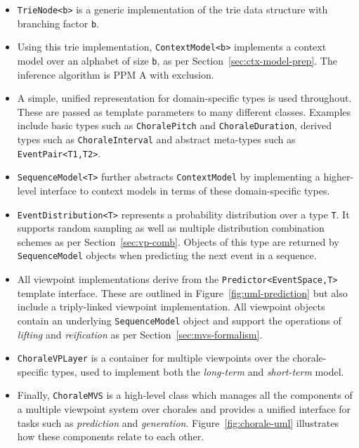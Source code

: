 \documentclass[12pt,a4paper,twoside,openright]{report}
\begin{document}
\begin{itemize}
  \item \texttt{TrieNode<b>} is a generic implementation of the trie data
    structure with branching factor \texttt{b}.
  \item Using this trie implementation, \texttt{ContextModel<b>} implements a
    context model over an alphabet of size \texttt{b}, as per
    Section~\ref{sec:ctx-model-prep}. The inference algorithm is PPM A with
    exclusion.
  \item A simple, unified representation for domain-specific types is used
    throughout.  These are passed as template parameters to many different
    classes. Examples include basic types such as \texttt{ChoralePitch} and
    \texttt{ChoraleDuration}, derived types such as \texttt{ChoraleInterval} and
    abstract meta-types such as \texttt{EventPair<T1,T2>}.
  \item \texttt{SequenceModel<T>} further abstracts \texttt{ContextModel} by
    implementing a higher-level interface to context models in terms of these
    domain-specific types.
  \item \texttt{EventDistribution<T>} represents a probability distribution over
    a type \texttt{T}. It supports random sampling as well as multiple
    distribution combination schemes as per Section~\ref{sec:vp-comb}. Objects
    of this type are returned by \texttt{SequenceModel} objects when predicting
    the next event in a sequence.
  \item All viewpoint implementations derive from the
    \texttt{Predictor<EventSpace,T>} template interface. These are outlined in
    Figure~\ref{fig:uml-prediction} but also include a triply-linked viewpoint
    implementation. All viewpoint objects contain an underlying
    \texttt{SequenceModel} object and support the operations of \emph{lifting}
    and \emph{reification} as per Section~\ref{sec:mvs-formalism}.
  \item \texttt{ChoraleVPLayer} is a container for multiple viewpoints over
    the chorale-specific types, used to
    implement both the \emph{long-term} and \emph{short-term} model.
  \item Finally, \texttt{ChoraleMVS} is a high-level class which manages all the
    components of a multiple viewpoint system over chorales and provides a
    unified interface for tasks such as \emph{prediction} and \emph{generation}.
    Figure~\ref{fig:chorale-uml} illustrates how these components relate to each
    other.
\end{itemize}
\end{document}

